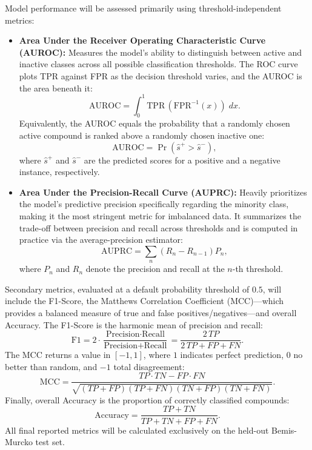 Model performance will be assessed primarily using threshold-independent metrics:
\begin{itemize}
    \item \textbf{Area Under the Receiver Operating Characteristic Curve (AUROC):} Measures the model's ability to distinguish between active and inactive classes across all possible classification thresholds. The ROC curve plots TPR against FPR as the decision threshold varies, and the AUROC is the area beneath it:
    \begin{equation}
        \text{AUROC} = \int_{0}^{1} \text{TPR}\,(\text{FPR}^{-1}(x))\; dx.
    \end{equation}
    Equivalently, the AUROC equals the probability that a randomly chosen active compound is ranked above a randomly chosen inactive one:
    \begin{equation}
        \text{AUROC} = \Pr\!\left(\hat{s}^{+} > \hat{s}^{-}\right),
    \end{equation}
    where $\hat{s}^{+}$ and $\hat{s}^{-}$ are the predicted scores for a positive and a negative instance, respectively.

    \item \textbf{Area Under the Precision-Recall Curve (AUPRC):} Heavily prioritizes the model's predictive precision specifically regarding the minority class, making it the most stringent metric for imbalanced data. It summarizes the trade-off between precision and recall across thresholds and is computed in practice via the average-precision estimator:
    \begin{equation}
        \text{AUPRC} = \sum_{n} \left( R_{n} - R_{n-1} \right) P_{n},
    \end{equation}
    where $P_{n}$ and $R_{n}$ denote the precision and recall at the $n$-th threshold.
\end{itemize}

Secondary metrics, evaluated at a default probability threshold of $0.5$, will include the F1-Score, the Matthews Correlation Coefficient (MCC)—which provides a balanced measure of true and false positives/negatives—and overall Accuracy. The F1-Score is the harmonic mean of precision and recall:
\begin{equation}
    \text{F1} = 2 \cdot \frac{\text{Precision} \cdot \text{Recall}}{\text{Precision} + \text{Recall}} = \frac{2\,TP}{2\,TP + FP + FN}.
\end{equation}
The MCC returns a value in $[-1, 1]$, where $1$ indicates perfect prediction, $0$ no better than random, and $-1$ total disagreement:
\begin{equation}
    \text{MCC} = \frac{TP \cdot TN - FP \cdot FN}{\sqrt{(TP + FP)(TP + FN)(TN + FP)(TN + FN)}}.
\end{equation}
Finally, overall Accuracy is the proportion of correctly classified compounds:
\begin{equation}
    \text{Accuracy} = \frac{TP + TN}{TP + TN + FP + FN}.
\end{equation}
All final reported metrics will be calculated exclusively on the held-out Bemis-Murcko test set.

